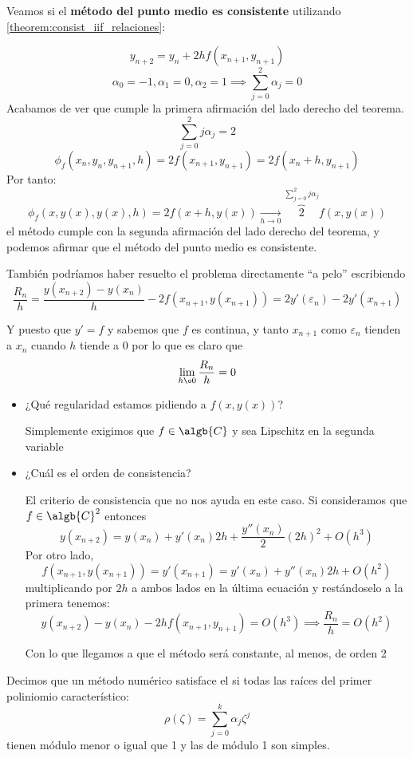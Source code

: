 \documentclass{apuntes}
\begin{document}
\begin{example}
	Veamos si el \textbf{método del punto medio es consistente} utilizando \ref{theorem:consist_iif_relaciones}:

	\[y_{n+2} = y_n + 2h f(x_{n+1},y_{n+1})\]
	\[α_0=-1, α_1=0, α_2=1 \implies \sum_{j=0}^2 α_j = 0\]
	Acabamos de ver que cumple la primera afirmación del lado derecho del teorema.
	\[\sum_{j=0}^2 jα_j = 2\]
	\[\phi_f(x_n,y_n,y_{n+1},h) = 2f(x_{n+1},y_{n+1}) = 2f(x_n+h, y_{n+1})\]
	Por tanto:
	\[\phi_f\left( x, y(x), y(x), h \right) = 2f(x+h,y(x)) \underset{h\to0}{\longrightarrow} \overbrace{2}^{\sum_{j=0}^2 jα_j}f(x,y(x))\]
	el método cumple con la segunda afirmación del lado derecho del teorema, y podemos afirmar que el método del punto medio es consistente.

	También podríamos haber resuelto el problema directamente ``a pelo'' escribiendo
	\[\frac{R_n}{h} = \frac{y(x_{n+2})-y(x_n)}{h}-2f(x_{n+1},y(x_{n+1})) = 2y'(ε_n)-2y'(x_{n+1})\]

	Y puesto que $y'=f$ y sabemos que $f$ es continua, y tanto $x_{n+1}$ como $ε_n$ tienden a $x_n$ cuando $h$ tiende a 0 por lo que es claro que
	\[\lim_{h \o 0} \frac{R_n}{h} = 0\]
\end{example}

\begin{obs}
\begin{itemize}
\item ¿Qué regularidad estamos pidiendo a $f(x,y(x))$?

Simplemente exigimos que $f\in \algb{C}$ y sea Lipschitz en la segunda variable

\item ¿Cuál es el orden de consistencia?

El criterio de consistencia que no nos ayuda en este caso. Si consideramos que $f\in \algb{C}^2$ entonces
\[y(x_{n+2})=y(x_n)+y'(x_n)2h + \frac{y''(x_n)}{2}(2h)^2 + O(h^3)\]
Por otro lado,
\[f(x_{n+1},y(x_{n+1}))=y'(x_{n+1}) = y'(x_n) + y''(x_n)2h + O(h^2)\]
multiplicando por $2h$ a ambos lados en la última ecuación y restándoselo a la primera tenemos:
\[y(x_{n+2})-y(x_n)-2hf(x_{n+1},y_{n+1})=O(h^3) \implies \frac{R_n}{h}=O(h^2)\]

Con lo que llegamos a que el método será constante, al menos, de orden 2
\end{itemize}
\end{obs}


Decimos que un método numérico satisface el  si todas las raíces del primer poliniomio característico:
\[ρ(ζ) = \sum_{j=0}^kα_jζ^j\]
tienen módulo menor o igual que 1 y las de módulo 1 son simples.
\end{document}
